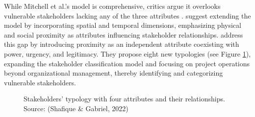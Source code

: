 \documentclass[authoryear,preprint,review,12pt]{elsarticle}
\begin{document}
    While Mitchell et al.'s model is comprehensive, critics argue it overlooks vulnerable stakeholders lacking any of the three attributes \citep{Shafique2022}. \citet{Driscoll2004} suggest extending the model by incorporating spatial and temporal dimensions, emphasizing physical and social proximity as attributes influencing stakeholder relationships. \citet{Shafique2022} address this gap by introducing proximity as an independent attribute coexisting with power, urgency, and legitimacy. They propose eight new typologies (see Figure \ref{fig:figure2}), expanding the stakeholder classification model and focusing on project operations beyond organizational management, thereby identifying and categorizing vulnerable stakeholders.
    \begin{figure}[h]
        \centering
        \caption{Stakeholders’ typology with four attributes and their relationships. Source: (Shafique \& Gabriel, 2022)}
        \label{fig:figure2}
    \end{figure}
\end{document}
